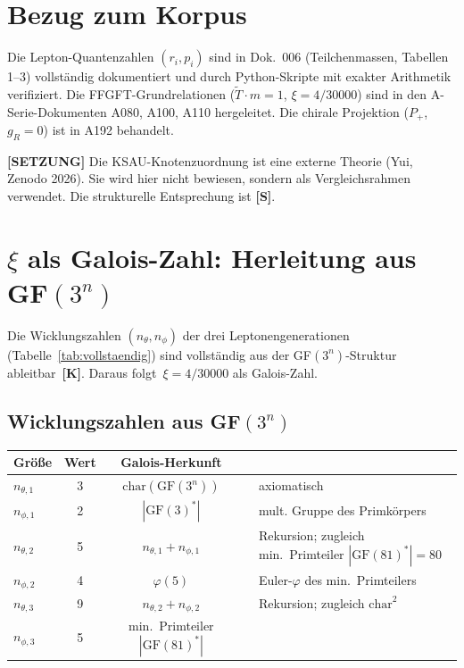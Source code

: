 \section{Bezug zum Korpus}

Die Lepton-Quantenzahlen $(r_i, p_i)$ sind in Dok.~006
(Teilchenmassen, Tabellen 1--3) vollständig dokumentiert und durch
Python-Skripte mit exakter Arithmetik verifiziert. Die
FFGFT-Grundrelationen ($\tilde{T} \cdot m = 1$, $\xi = 4/30000$)
sind in den A-Serie-Dokumenten A080, A100, A110 hergeleitet.
Die chirale Projektion ($P_+$, $g_R = 0$) ist in A192 behandelt.

\textbf{[SETZUNG]} Die KSAU-Knotenzuordnung ist eine externe Theorie
(Yui, Zenodo 2026). Sie wird hier nicht bewiesen, sondern als
Vergleichsrahmen verwendet. Die strukturelle Entsprechung ist
\textbf{[S]}.

\section{$\xi$ als Galois-Zahl: Herleitung aus GF$(3^n)$}
\label{sec:xi_galois}

Die Wicklungszahlen $(n_\theta, n_\phi)$ der drei Leptonengenerationen
(Tabelle~\ref{tab:vollstaendig}) sind vollständig aus der
GF$(3^n)$-Struktur ableitbar~\textbf{[K]}.
Daraus folgt~$\xi = 4/30000$ als Galois-Zahl.

\subsection*{Wicklungszahlen aus GF$(3^n)$}

\begin{center}
\begin{tabular}{lcccl}
\toprule
Größe & Wert & Galois-Herkunft & & \\
\midrule
$n_{\theta,1}$ & 3 & $\text{char}(\text{GF}(3^n))$ & & axiomatisch \\
$n_{\phi,1}$   & 2 & $|\text{GF}(3)^*|$ & & mult. Gruppe des Primkörpers \\
$n_{\theta,2}$ & 5 & $n_{\theta,1}+n_{\phi,1}$ & & Rekursion; zugleich min.\ Primteiler $|\text{GF}(81)^*|=80$ \\
$n_{\phi,2}$   & 4 & $\varphi(5)$ & & Euler-$\varphi$ des min.\ Primteilers \\
$n_{\theta,3}$ & 9 & $n_{\theta,2}+n_{\phi,2}$ & & Rekursion; zugleich $\text{char}^2$ \\
$n_{\phi,3}$   & 5 & min.\ Primteiler $|\text{GF}(81)^*|$ & & \\
\bottomrule
\end{tabular}
\end{center}

